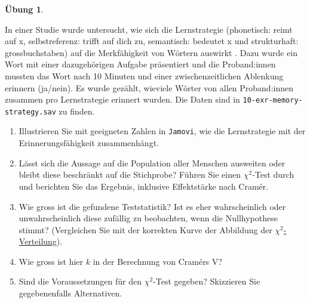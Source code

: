 \documentclass[
]{book}
\providecommand{\tightlist}{%
  \setlength{\itemsep}{0pt}\setlength{\parskip}{0pt}}
\theoremstyle{definition}
\theoremstyle{definition}
\theoremstyle{definition}
\newtheorem{exercise}{Übung}[chapter]
\theoremstyle{definition}
\theoremstyle{remark}
\begin{document}
\begin{exercise}
\protect\hypertarget{exr:memory-strategy}{}\label{exr:memory-strategy}\leavevmode

In einer Studie wurde untersucht, wie sich die Lernstrategie (phonetisch: reimt auf x, selbstreferenz: trifft auf dich zu, semantisch: bedeutet x und strukturhaft: grossbuchstaben) auf die Merkfähigkeit von Wörtern auswirkt \citep{rogers1977}. Dazu wurde ein Wort mit einer dazugehörigen Aufgabe präsentiert und die Proband:innen mussten das Wort nach 10 Minuten und einer zwischenzeitlichen Ablenkung erinnern (ja/nein). Es wurde gezählt, wieviele Wörter von allen Proband:innen zusammen pro Lernstrategie erinnert wurden. Die Daten sind in \texttt{10-exr-memory-strategy.sav} zu finden.

\begin{enumerate}
\def\labelenumi{\alph{enumi})}
\tightlist
\item
  Illustrieren Sie mit geeigneten Zahlen in \texttt{Jamovi}, wie die Lernstrategie mit der Erinnerungsfähigkeit zusammenhängt.
\item
  Lässt sich die Aussage auf die Population aller Menschen ausweiten oder bleibt diese beschränkt auf die Stichprobe? Führen Sie einen \(\chi^2\)-Test durch und berichten Sie das Ergebnis, inklusive Effektstärke nach Cramér.
\item
  Wie gross ist die gefundene Teststatistik? Ist es eher wahrscheinlich oder unwahrscheinlich diese zufällig zu beobachten, wenn die Nullhypothese stimmt? (Vergleichen Sie mit der korrekten Kurve der Abbildung der \href{https://de.wikipedia.org/wiki/Chi-Quadrat-Verteilung}{\(\chi^2\)-Verteilung}).
\item
  Wie gross ist hier \(k\) in der Berechnung von Cramérs V?
\item
  Sind die Voraussetzungen für den \(\chi^2\)-Test gegeben? Skizzieren Sie gegebenenfalls Alternativen.
\end{enumerate}

\end{exercise}
\end{document}
